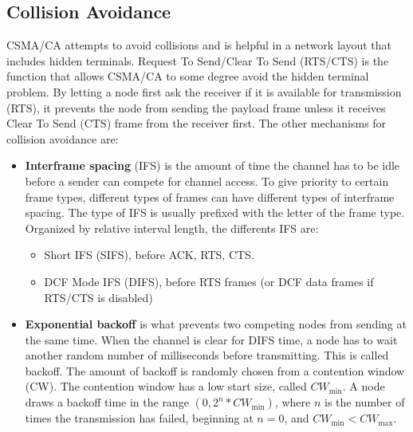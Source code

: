      \subsection{Collision Avoidance}
CSMA/CA attempts to avoid collisions and is helpful in a network layout that includes hidden terminals. Request To Send/Clear To Send (RTS/CTS)
	is the function that allows CSMA/CA to some degree avoid the hidden terminal problem. By letting a node first ask the receiver if it is
	available for transmission (RTS), it prevents the node from sending the payload frame unless it receives Clear To Send (CTS) frame from the receiver first.
	The other mechanisms for collision avoidance are: 
	\begin{itemize}	
	\item \textbf{Interframe spacing} (IFS) is the amount of time the channel has to be idle before a sender can compete for channel access. 
	To give priority to certain frame types, different types of frames can have different types of interframe spacing. The type of IFS is usually 
	prefixed with the letter of the frame type. Organized by relative interval length, the differents IFS are:
	\begin{itemize} 
	\item Short IFS (SIFS), before ACK, RTS, CTS.  
	\item DCF Mode IFS (DIFS), before RTS frames (or DCF data frames if RTS/CTS is disabled)

	\end{itemize}
	\item \textbf{Exponential backoff} is what prevents two competing nodes from sending at the same time. When the channel is clear
	for DIFS time, a node has to wait another  random number of milliseconds before transmitting. This is called backoff.
	The amount of backoff is randomly chosen from a contention window (CW). The contention window has a low start size,
	called $CW_{\text{min}}$. A node draws a backoff time in the range $(0, 2^n*CW_{\text{min}})$, where $n$ is the number 
	of times the transmission has failed, beginning at $n=0$, and $CW_{\text{min}}<CW_{\text{max}}$.
	\end{itemize}

